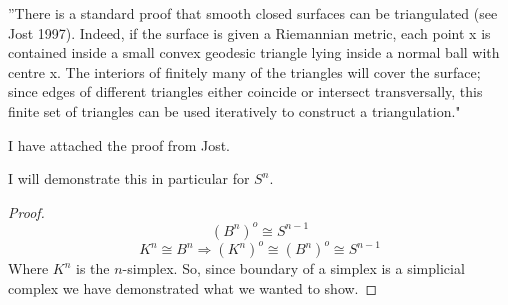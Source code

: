 \documentclass[10pt]{article}
\begin{document}
''There is a standard proof that smooth closed surfaces can be triangulated (see Jost 1997). Indeed, if the surface is given a Riemannian metric, each point x is contained inside a small convex geodesic triangle lying inside a normal ball with centre x. The interiors of finitely many of the triangles will cover the surface; since edges of different triangles either coincide or intersect transversally, this finite set of triangles can be used iteratively to construct a triangulation."

I have attached the proof from Jost.

I will demonstrate this in particular for $S^n$.

\begin{proof}
\[ (B^n)^o \cong S^{n-1}\]
\[K^n \cong B^n \Rightarrow (K^n)^o \cong ( B^n)^o \cong S^{n-1}\]
Where $K^n$ is the $n$-simplex. So, since boundary of a simplex is a simplicial complex we have demonstrated what we wanted to show.
\end{proof}
\end{document}
